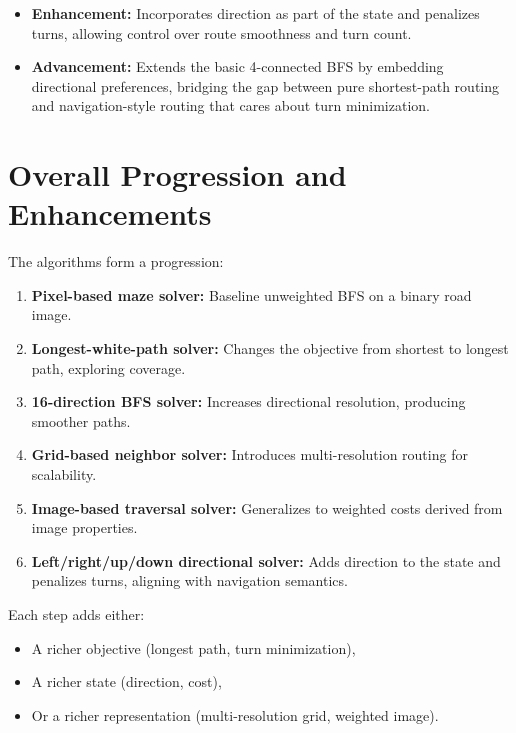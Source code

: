 \documentclass[11pt]{article}
\begin{document}
\begin{itemize}
  \item \textbf{Enhancement:} Incorporates direction as part of the
  state and penalizes turns, allowing control over route smoothness and
  turn count.
  \item \textbf{Advancement:} Extends the basic 4-connected BFS by
  embedding directional preferences, bridging the gap between pure
  shortest-path routing and navigation-style routing that cares about
  turn minimization.
\end{itemize}
\clearpage
\section{Overall Progression and Enhancements}

The algorithms form a progression:
\begin{enumerate}
  \item \textbf{Pixel-based maze solver:} Baseline unweighted BFS on a
  binary road image.
  \item \textbf{Longest-white-path solver:} Changes the objective from
  shortest to longest path, exploring coverage.
  \item \textbf{16-direction BFS solver:} Increases directional
  resolution, producing smoother paths.
  \item \textbf{Grid-based neighbor solver:} Introduces multi-resolution
  routing for scalability.
  \item \textbf{Image-based traversal solver:} Generalizes to weighted
  costs derived from image properties.
  \item \textbf{Left/right/up/down directional solver:} Adds direction
  to the state and penalizes turns, aligning with navigation semantics.
\end{enumerate}

Each step adds either:
\begin{itemize}
  \item A richer objective (longest path, turn minimization),
  \item A richer state (direction, cost),
  \item Or a richer representation (multi-resolution grid, weighted
  image).
\end{itemize}
\end{document}
